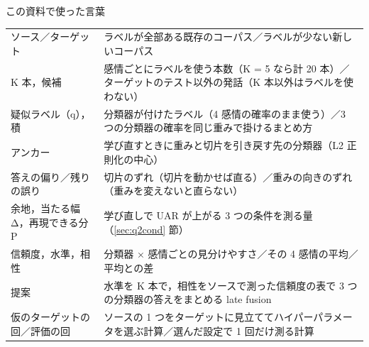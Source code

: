 \documentclass[a4paper,10pt]{ltjsarticle}
\newcommand{\shiryo}[1]{\ref{#1} 節}
\begin{document}
\begin{waku}{この資料で使った言葉}
\footnotesize
\begin{tabular}{@{}>{\raggedright}p{3.6cm}>{\raggedright\arraybackslash}p{12.4cm}@{}}
ソース／ターゲット & ラベルが全部ある既存のコーパス／ラベルが少ない新しいコーパス \\
K 本，候補 & 感情ごとにラベルを使う本数（K = 5 なら計 20 本）／ターゲットのテスト以外の発話（K 本以外はラベルを使わない） \\
疑似ラベル（q），積 & 分類器が付けたラベル（4 感情の確率のまま使う）／3 つの分類器の確率を同じ重みで掛けるまとめ方 \\
アンカー & 学び直すときに重みと切片を引き戻す先の分類器（L2 正則化の中心） \\
答えの偏り／残りの誤り & 切片のずれ（切片を動かせば直る）／重みの向きのずれ（重みを変えないと直らない） \\
余地，当たる幅 Δ，再現できる分 P & 学び直しで UAR が上がる 3 つの条件を測る量（\shiryo{sec:q2cond}） \\
信頼度，水準，相性 & 分類器 × 感情ごとの見分けやすさ／その 4 感情の平均／平均との差 \\
提案 & 水準を K 本で，相性をソースで測った信頼度の表で 3 つの分類器の答えをまとめる late fusion \\
仮のターゲットの回／評価の回 & ソースの 1 つをターゲットに見立ててハイパーパラメータを選ぶ計算／選んだ設定で 1 回だけ測る計算 \\
\end{tabular}
\end{waku}
\end{document}
